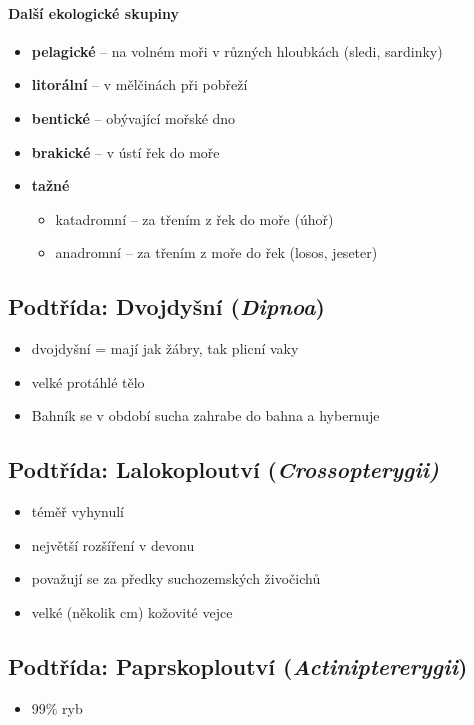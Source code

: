 \paragraph{Další ekologické skupiny}
\begin{itemize}
\item \textbf{pelagické} -- na volném moři v různých hloubkách (sledi, sardinky)
\item \textbf{litorální} -- v mělčinách při pobřeží
\item \textbf{bentické} -- obývající mořské dno
\item \textbf{brakické} -- v ústí řek do moře
\item \textbf{tažné}
	\begin{itemize}
	\item katadromní -- za třením z řek do moře (úhoř)
	\item anadromní -- za třením z moře do řek (losos, jeseter)
	\end{itemize}
\end{itemize}


\subsection{Podtřída: Dvojdyšní (\textit{Dipnoa})}
\begin{itemize}
\item dvojdyšní = mají jak žábry, tak plicní vaky
\item velké protáhlé tělo
\item Bahník se v období sucha zahrabe do bahna a hybernuje
\end{itemize}

\subsection{Podtřída: Lalokoploutví (\textit{Crossopterygii)}}
\begin{itemize}
\item téměř vyhynulí
\item největší rozšíření v devonu
\item považují se za předky suchozemských živočichů
\item velké (několik cm) kožovité vejce
\end{itemize}

\subsection{Podtřída: Paprskoploutví (\textit{Actiniptererygii})}
\begin{itemize}
\item 99\% ryb
\end{itemize}

